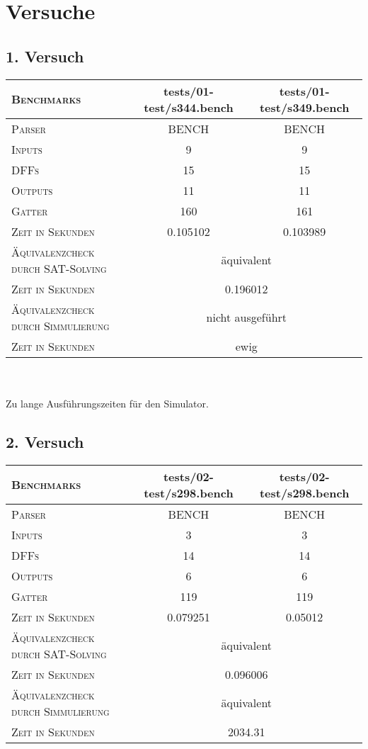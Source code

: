 \chapter{Versuche}

\section{1. Versuch}

\begin{tabular}{|l|c|c|}
	\hline
	\textsc{Benchmarks} & tests/01-test/s344.bench & tests/01-test/s349.bench \\
	\hline
	\hline
	\textsc{Parser} & BENCH & BENCH \\
	\hline
	\textsc{Inputs} & 9 & 9 \\
	\hline
	\textsc{DFFs} & 15 & 15 \\
	\hline
	\textsc{Outputs} & 11 & 11 \\
	\hline
	\textsc{Gatter} & 160 & 161 \\		
	\hline
	\textsc{Zeit in Sekunden} & 0.105102 &  0.103989 \\ 
	\hline
	\hline
	\textsc{Äquivalenzcheck durch SAT-Solving} & \multicolumn{2}{|c|}{äquivalent} \\
	\hline
	\textsc{Zeit in Sekunden} & \multicolumn{2}{|c|}{0.196012} \\
	\hline
	\hline
	\textsc{Äquivalenzcheck durch Simmulierung} & \multicolumn{2}{|c|}{nicht ausgeführt} \\
	\hline
	\textsc{Zeit in Sekunden} & \multicolumn{2}{|c|}{ewig} \\
	\hline
\end{tabular}
\\\\ 
Zu lange Ausführungszeiten für den Simulator.

\section{2. Versuch}

\begin{tabular}{|l|c|c|}
	\hline
	\textsc{Benchmarks} & tests/02-test/s298.bench & tests/02-test/s298.bench \\
	\hline
	\hline
	\textsc{Parser} & BENCH & BENCH \\
	\hline
	\textsc{Inputs} & 3 & 3 \\
	\hline
	\textsc{DFFs} & 14 & 14 \\
	\hline
	\textsc{Outputs} & 6 & 6 \\
	\hline
	\textsc{Gatter} & 119 & 119 \\		
	\hline
	\textsc{Zeit in Sekunden} & 0.079251 &  0.05012 \\ 
	\hline
	\hline
	\textsc{Äquivalenzcheck durch SAT-Solving} & \multicolumn{2}{|c|}{äquivalent} \\
	\hline
	\textsc{Zeit in Sekunden} & \multicolumn{2}{|c|}{0.096006} \\
	\hline
	\hline
	\textsc{Äquivalenzcheck durch Simmulierung} & \multicolumn{2}{|c|}{äquivalent} \\
	\hline
	\textsc{Zeit in Sekunden} & \multicolumn{2}{|c|}{2034.31} \\
	\hline
\end{tabular}

